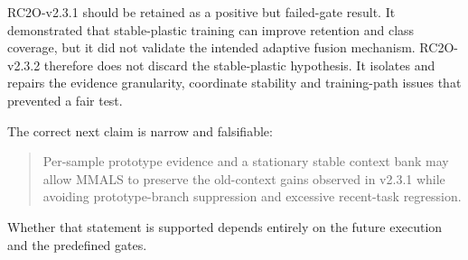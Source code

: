 \documentclass[11pt,a4paper]{article}
\begin{document}
RC2O-v2.3.1 should be retained as a positive but failed-gate result. It demonstrated that stable-plastic training can improve retention and class coverage, but it did not validate the intended adaptive fusion mechanism. RC2O-v2.3.2 therefore does not discard the stable-plastic hypothesis. It isolates and repairs the evidence granularity, coordinate stability and training-path issues that prevented a fair test.

The correct next claim is narrow and falsifiable:

\begin{quote}
Per-sample prototype evidence and a stationary stable context bank may allow MMALS to preserve the old-context gains observed in v2.3.1 while avoiding prototype-branch suppression and excessive recent-task regression.
\end{quote}

Whether that statement is supported depends entirely on the future execution and the predefined gates.
\end{document}
